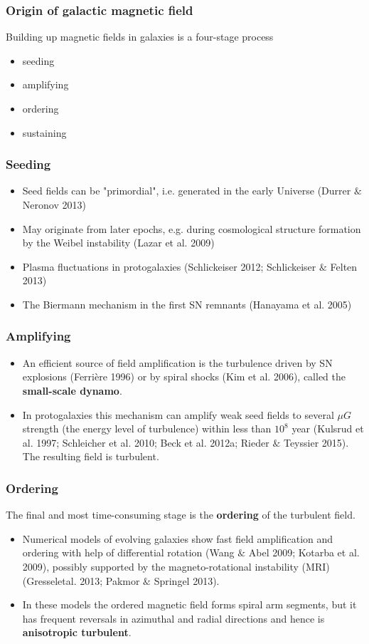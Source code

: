 \documentclass[10pt,aspectratio=169]{beamer}
\begin{document}
\begin{frame}
	\frametitle{Origin of galactic magnetic field}
	Building up magnetic fields in galaxies is a four-stage process
	\begin{itemize}
		\item seeding
		\item amplifying
		\item ordering
		\item sustaining
	\end{itemize}
\end{frame}
\begin{frame}
	\frametitle{Seeding}
	\begin{itemize}
		\item Seed fields can be "primordial", i.e. generated in the early Universe (Durrer $\&$ Neronov 2013)
		\item May originate from later epochs, e.g. during cosmological structure formation by the Weibel instability (Lazar et al. 2009)
		\item Plasma fluctuations in protogalaxies (Schlickeiser 2012; Schlickeiser $\&$ Felten 2013)
		\item The Biermann mechanism in the first SN remnants (Hanayama et al. 2005)
	\end{itemize}
\end{frame}
\begin{frame}
	\frametitle{Amplifying}
	\begin{itemize}
		\item An efficient source of field amplification is the turbulence driven by SN explosions (Ferrière 1996) or by spiral shocks (Kim et al. 2006), called the \textbf{small-scale dynamo}.
		\item In protogalaxies this mechanism can amplify weak seed fields to several $\mu G$ strength (the energy level of turbulence) within less than $10^8$ year (Kulsrud et al. 1997; Schleicher et al. 2010; Beck et al. 2012a; Rieder $\&$ Teyssier 2015). The resulting field is turbulent.
	\end{itemize}
\end{frame}
\begin{frame}
	\frametitle{Ordering}
	The final and most time-consuming stage is the \textbf{ordering} of the turbulent field.
	\begin{itemize}
		\item Numerical models of evolving galaxies show fast field amplification and ordering with help of differential rotation (Wang $\&$ Abel 2009; Kotarba et al. 2009), possibly supported by the magneto-rotational instability (MRI) (Gresseletal. 2013; Pakmor $\&$ Springel 2013).
		\item In these models the ordered magnetic field forms spiral arm segments, but it has frequent reversals in azimuthal and radial directions and hence is \textbf{anisotropic turbulent}.
	\end{itemize}
\end{frame}
\end{document}
